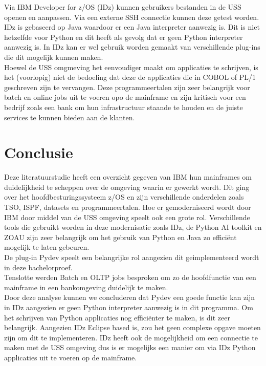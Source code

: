 Via IBM Developer for z/OS (IDz) kunnen gebruikers bestanden in de USS openen en aanpassen. Via een externe SSH connectie kunnen deze getest worden. IDz is gebaseerd op Java waardoor er een Java interpreter aanwezig is. Dit is niet hetzelfde voor Python en dit heeft als gevolg dat er geen Python interpreter aanwezig is. In IDz kan er wel gebruik worden gemaakt van verschillende plug-ins die dit mogelijk kunnen maken. \\

Hoewel de USS omgmeving het eenvoudiger maakt om applicaties te schrijven, is het (voorlopig) niet de bedoeling dat deze de applicaties die in COBOL of PL/1 geschreven zijn te vervangen. Deze programmeertalen zijn zeer belangrijk voor batch en online jobs uit te voeren opo de mainframe en zijn kritisch voor een bedrijf zoals een bank om hun infrastructuur staande te houden en de juiste services te kunnen bieden aan de klanten. 

\newpage
\section{Conclusie}
Deze literatuurstudie heeft een overzicht gegeven van IBM hun mainframes om duidelijkheid te scheppen over de omgeving waarin er gewerkt wordt. Dit ging over het hoofdbesturingssysteem z/OS en zijn verschillende onderdelen zoals TSO, ISPF, datasets en programmeertalen. Hoe er gemoderniseerd wordt door IBM door middel van de USS omgeving speelt ook een grote rol. Verschillende tools die gebruikt worden in deze modernisatie zoals IDz, de Python AI toolkit en ZOAU zijn zeer belangrijk om het gebruik van Python en Java zo efficiënt mogelijk te laten gebeuren. \\

De plug-in Pydev speelt een belangrijke rol aangezien dit geimplementeerd wordt in deze bachelorproef. \\

Tenslotte werden Batch en OLTP jobs besproken om zo de hoofdfunctie van een mainframe in een bankomgeving duidelijk te maken.\\

Door deze analyse kunnen we concluderen dat Pydev een goede functie kan zijn in IDz aangezien er geen Python interpreter aanwezig is in dit programma. Om het schrijven van Python applicaties nog efficiënter te maken, is dit zeer belangrijk. Aangezien IDz Eclipse based is, zou het geen complexe opgave moeten zijn om dit te implementeren. IDz heeft ook de mogelijkheid om een connectie te maken met de USS omgeving dus is er mogelijks een manier om via IDz Python applicaties uit te voeren op de mainframe. \\

